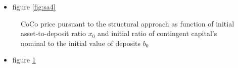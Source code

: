   \begin{itemize}
  \item figure \ref{fig:sa4}
  \end{itemize}

\begin{figure}[H]
\centering
    \caption[CoCo price pursuant to the structural approach as function of asset-to-deposit ratio and initial ratio of contingent capital's nominal to deposits]{CoCo price pursuant to the structural approach as function of initial asset-to-deposit ratio $x_0$ and initial ratio of contingent capital's nominal to the initial value of deposits $b_0$}
  \label{fig:sa5}
  \end{figure}

  \begin{itemize}
  \item figure \ref{fig:sa5}
  \end{itemize}

